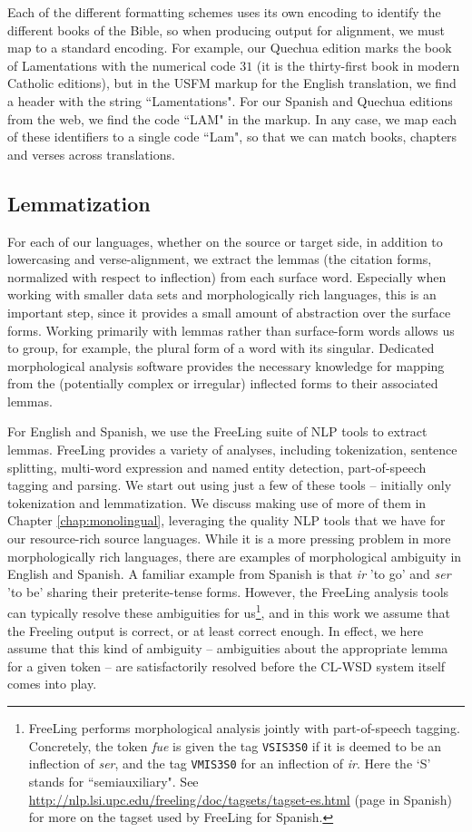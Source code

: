 Each of the different formatting schemes uses its own encoding to identify the
different books of the Bible, so when producing output for alignment, we must
map to a standard encoding. For example, our Quechua edition marks the book of
Lamentations with the numerical code $31$ (it is the thirty-first book in
modern Catholic editions), but in the USFM markup for the English translation,
we find a header with the string ``Lamentations". For our Spanish and Quechua
editions from the web, we find the code ``LAM" in the markup. In any case, we
map each of these identifiers to a single code ``Lam", so that we can match
books, chapters and verses across translations.

\subsection{Lemmatization}
\label{sec:guaranima}

For each of our languages, whether on the source or target side, in addition to
lowercasing and verse-alignment, we extract the lemmas (the
citation forms, normalized with respect to inflection) from each surface word.
Especially when working with smaller data sets and morphologically rich
languages, this is an important step, since it provides a small amount of
abstraction over the surface forms. Working primarily with lemmas rather than
surface-form words allows us to group, for example, the plural form of a word
with its singular. Dedicated morphological analysis software provides the
necessary knowledge for mapping from the (potentially complex or irregular)
inflected forms to their associated lemmas.

For English and Spanish, we use the FreeLing suite of NLP tools
\cite{padro12} to extract lemmas. FreeLing provides a variety of analyses,
including tokenization, sentence splitting, multi-word expression and named
entity detection, part-of-speech tagging and parsing.  We start out using just
a few of these tools -- initially only tokenization and lemmatization. We
discuss making use of more of them in Chapter \ref{chap:monolingual},
leveraging the quality NLP tools that we have for our resource-rich source
languages.
While it is a more pressing problem in more morphologically rich languages,
there are examples of morphological ambiguity in English and
Spanish. A familiar example from Spanish is that \emph{ir} 'to
go' and \emph{ser} 'to be' sharing their preterite-tense forms.
However, the FreeLing analysis tools can typically resolve these ambiguities
for us\footnote{FreeLing performs morphological analysis jointly with
part-of-speech tagging. Concretely, the token \emph{fue} is given the tag
\texttt{VSIS3S0} if it is deemed to be an inflection of \emph{ser}, and the tag
\texttt{VMIS3S0} for an inflection of \emph{ir}. Here the `S' stands for
``semiauxiliary". See
\url{http://nlp.lsi.upc.edu/freeling/doc/tagsets/tagset-es.html} (page
in Spanish) for more on the tagset used by FreeLing for Spanish.}, and in this
work we assume that the Freeling output is correct, or at least correct enough.
In effect, we here assume that this kind of ambiguity -- ambiguities about the
appropriate lemma for a given token -- are satisfactorily resolved before the
CL-WSD system itself comes into play.

